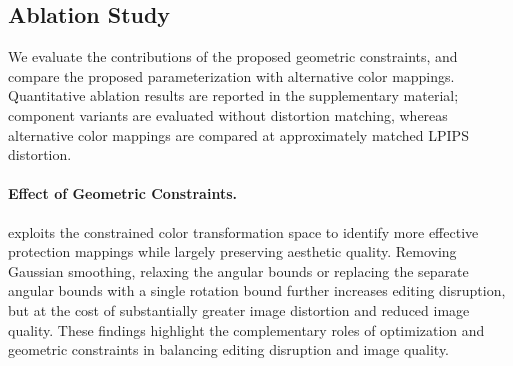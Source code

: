 

\subsection{Ablation Study}
\label{sec:exp_ablation}
We evaluate the contributions of the proposed geometric constraints, and compare the proposed parameterization with alternative color mappings. Quantitative ablation results are reported in the supplementary material; component variants are evaluated without distortion matching, whereas alternative color mappings are compared at approximately matched LPIPS distortion.

\paragraph{Effect of Geometric Constraints.}
\capg{} exploits the constrained color transformation space to identify more effective protection mappings while largely preserving aesthetic quality. Removing Gaussian smoothing,  relaxing the angular bounds or replacing the separate angular bounds with a single rotation bound further increases editing disruption, but at the cost of substantially greater image distortion and reduced image quality. These findings highlight the complementary roles of optimization and geometric constraints in balancing editing disruption and image quality.

